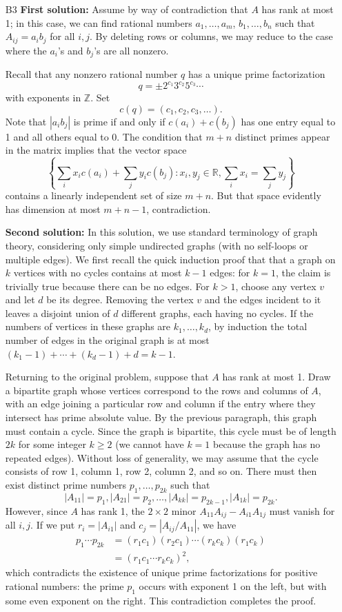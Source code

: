 \documentclass[amssymb,twocolumn,pra,10pt,aps]{revtex4-1}
\newcommand{\RR}{\mathbb{R}}
\newcommand{\ZZ}{\mathbb{Z}}
\begin{document}
\begin{itemize}
\item[B3]
\textbf{First solution:}
Assume by way of contradiction that $A$ has rank at most 1;
in this case, we can find rational numbers $a_1,\dots,a_m$, $b_1,\dots,b_n$ such that
$A_{ij} = a_i b_j$ for all $i,j$. By deleting rows or columns, we may reduce to the case where the $a_i$'s and $b_j$'s are all nonzero.

Recall that any nonzero rational number $q$ has a unique prime factorization
\[
q = \pm 2^{c_1} 3^{c_2} 5^{c_3} \cdots
\]
with exponents in $\ZZ$. Set
\[
c(q) = (c_1, c_2, c_3, \dots).
\]
Note that $|a_i b_j|$ is prime if and only if $c(a_i) + c(b_j)$ has one entry equal to 1 and all others equal to 0. The condition that $m+n$ distinct primes appear in the matrix implies that the vector space 
\[
\left\{ \sum_i x_i c(a_i) + \sum_j y_i c(b_j) : x_i, y_j \in \RR, \sum_i x_i = \sum_j y_j \right\} 
\]
contains a linearly independent set of size $m+n$. But that space evidently has dimension at most $m+n-1$, contradiction.

\textbf{Second solution:}
In this solution, we use standard terminology of graph theory, considering only simple undirected graphs (with no self-loops or multiple edges).
We first recall the quick induction proof that that a graph on $k$ vertices
 with no cycles contains at most $k-1$ edges: for $k=1$, the claim is trivially true because there can be no edges.
For $k>1$, choose any vertex $v$ and let $d$ be its degree. Removing the vertex $v$ and the edges incident to it leaves a disjoint union of $d$ different graphs, each having no cycles. If the numbers of vertices in these graphs are $k_1,\dots,k_d$, by induction the total number of edges in the original graph is at most $(k_1 - 1) + \cdots + (k_d - 1) + d = k - 1$.

Returning to the original problem, suppose that $A$ has rank at most 1.
Draw a bipartite graph whose vertices correspond to the rows and columns of $A$, with an edge joining a particular row and column if the entry where they intersect has prime absolute value. By the previous paragraph, this graph must contain a cycle. Since the graph is bipartite, this cycle must be of length $2k$ for some integer $k \geq 2$ (we cannot have $k=1$ because the graph has no repeated edges). Without loss of generality, we may assume that the cycle consists of row 1, column 1, row 2, column 2, and so on. There must then exist distinct prime numbers $p_1, \dots, p_{2k}$ such that
\[
\left| A_{11} \right| = p_1, \left| A_{21} \right| = p_2, \dots,
\left| A_{kk} \right| = p_{2k-1}, \left| A_{1k} \right| = p_{2k}.
\]
However, since $A$ has rank 1, the $2 \times 2$ minor $A_{11} A_{ij} - A_{i1} A_{1j}$ must vanish for all $i,j$. If we put $r_i = \left|A_{i1} \right|$ and $c_j = \left| A_{ij}/A_{11} \right|$, we have
\begin{align*}
p_1 \cdots p_{2k} &= (r_1 c_1)(r_2 c_1) \cdots (r_k c_k) (r_1 c_k) \\
&= (r_1 c_1 \cdots r_k c_k)^2,
\end{align*}
which contradicts the existence of unique prime factorizations for positive rational numbers: the prime $p_1$ occurs with exponent 1 on the left, but with some even exponent on the right. This contradiction completes the proof.


\end{itemize}
\end{document}
